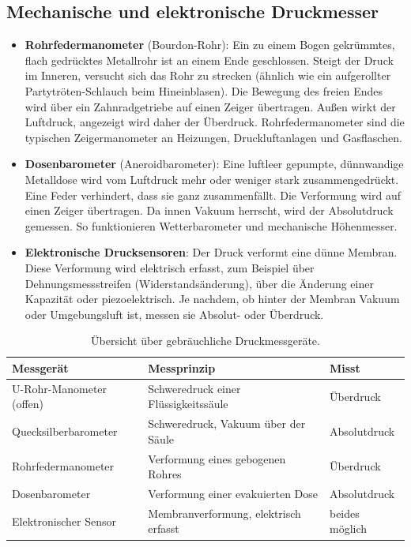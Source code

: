 \subsection{Mechanische und elektronische Druckmesser}
\begin{itemize}
    \item \textbf{Rohrfedermanometer} (Bourdon-Rohr): Ein zu einem Bogen gekrümmtes, flach gedrücktes Metallrohr ist an einem Ende geschlossen. Steigt der Druck im Inneren, versucht sich das Rohr zu strecken (ähnlich wie ein aufgerollter Partytröten-Schlauch beim Hineinblasen). Die Bewegung des freien Endes wird über ein Zahnradgetriebe auf einen Zeiger übertragen. Außen wirkt der Luftdruck, angezeigt wird daher der Überdruck. Rohrfedermanometer sind die typischen Zeigermanometer an Heizungen, Druckluftanlagen und Gasflaschen.
    \item \textbf{Dosenbarometer} (Aneroidbarometer): Eine luftleer gepumpte, dünnwandige Metalldose wird vom Luftdruck mehr oder weniger stark zusammengedrückt. Eine Feder verhindert, dass sie ganz zusammenfällt. Die Verformung wird auf einen Zeiger übertragen. Da innen Vakuum herrscht, wird der Absolutdruck gemessen. So funktionieren Wetterbarometer und mechanische Höhenmesser.
    \item \textbf{Elektronische Drucksensoren}: Der Druck verformt eine dünne Membran. Diese Verformung wird elektrisch erfasst, zum Beispiel über Dehnungsmessstreifen (Widerstandsänderung), über die Änderung einer Kapazität oder piezoelektrisch. Je nachdem, ob hinter der Membran Vakuum oder Umgebungsluft ist, messen sie Absolut- oder Überdruck.
\end{itemize}

\begin{table}[htb]
    \centering
    \caption{Übersicht über gebräuchliche Druckmessgeräte.}\label{tab: druckmessgeraete}
    \vspace{4pt}
    \small
    \begin{tabular}{l l l}
        \toprule
        \textbf{Messgerät} & \textbf{Messprinzip} & \textbf{Misst} \\
        \midrule
        U-Rohr-Manometer (offen) & Schweredruck einer Flüssigkeitssäule & Überdruck \\
        Quecksilberbarometer & Schweredruck, Vakuum über der Säule & Absolutdruck \\
        Rohrfedermanometer & Verformung eines gebogenen Rohres & Überdruck \\
        Dosenbarometer & Verformung einer evakuierten Dose & Absolutdruck \\
        Elektronischer Sensor & Membranverformung, elektrisch erfasst & beides möglich \\
        \bottomrule
    \end{tabular}
\end{table}

